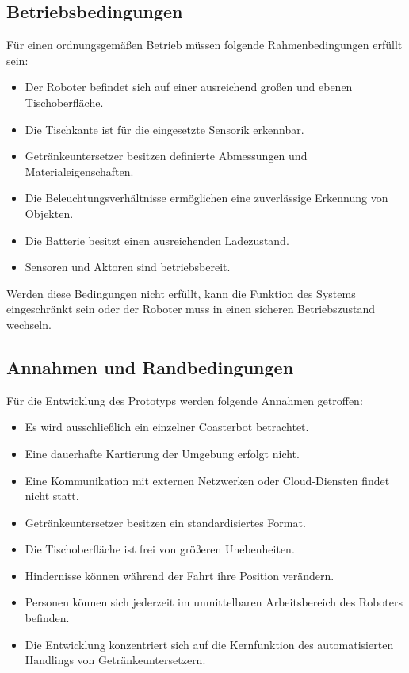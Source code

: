 \documentclass[
  a4paper,
  12pt,
  DIV=12,        %
  parskip=half,  %
  headings=small %
]{scrartcl}
\theoremstyle{definition}
\providecommand{\tightlist}{%
  \setlength{\itemsep}{0pt}\setlength{\parskip}{0pt}}
\theoremstyle{definition}
\begin{document}
\subsection{Betriebsbedingungen}\label{betriebsbedingungen}

Für einen ordnungsgemäßen Betrieb müssen folgende Rahmenbedingungen
erfüllt sein:

\begin{itemize}
\tightlist
\item
  Der Roboter befindet sich auf einer ausreichend großen und ebenen
  Tischoberfläche.
\item
  Die Tischkante ist für die eingesetzte Sensorik erkennbar.
\item
  Getränkeuntersetzer besitzen definierte Abmessungen und
  Materialeigenschaften.
\item
  Die Beleuchtungsverhältnisse ermöglichen eine zuverlässige Erkennung
  von Objekten.
\item
  Die Batterie besitzt einen ausreichenden Ladezustand.
\item
  Sensoren und Aktoren sind betriebsbereit.
\end{itemize}

Werden diese Bedingungen nicht erfüllt, kann die Funktion des Systems
eingeschränkt sein oder der Roboter muss in einen sicheren
Betriebszustand wechseln.

\subsection{Annahmen und
Randbedingungen}\label{annahmen-und-randbedingungen}

Für die Entwicklung des Prototyps werden folgende Annahmen getroffen:

\begin{itemize}
\tightlist
\item
  Es wird ausschließlich ein einzelner Coasterbot betrachtet.
\item
  Eine dauerhafte Kartierung der Umgebung erfolgt nicht.
\item
  Eine Kommunikation mit externen Netzwerken oder Cloud-Diensten findet
  nicht statt.
\item
  Getränkeuntersetzer besitzen ein standardisiertes Format.
\item
  Die Tischoberfläche ist frei von größeren Unebenheiten.
\item
  Hindernisse können während der Fahrt ihre Position verändern.
\item
  Personen können sich jederzeit im unmittelbaren Arbeitsbereich des
  Roboters befinden.
\item
  Die Entwicklung konzentriert sich auf die Kernfunktion des
  automatisierten Handlings von Getränkeuntersetzern.
\end{itemize}
\end{document}
